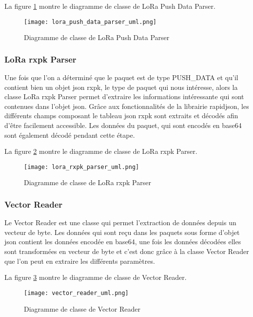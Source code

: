 La figure \ref{fig:lora_push_data_parser_uml} montre le diagramme de classe de LoRa Push Data Parser.

\begin{figure}[htb]
\centering 
\texttt{[image: lora\_push\_data\_parser\_uml.png]} 
\caption{Diagramme de classe de LoRa Push Data Parser}
\label{fig:lora_push_data_parser_uml}
 \end{figure}

\subsubsection{LoRa rxpk Parser}

Une fois que l'on a déterminé que le paquet est de type PUSH\_DATA et qu'il contient bien un objet json rxpk, le type de paquet qui nous intéresse, alors la classe LoRa rxpk Parser permet d'extraire les informations intéressante qui sont contenues dans l'objet json. Grâce aux fonctionnalités de la librairie rapidjson, les différents champs composant le tableau json rxpk sont extraits et décodés afin d'être facilement accessible. Les données du paquet, qui sont encodés en base64 sont également décodé pendant cette étape.

La figure \ref{fig:lora_rxpk_parser_uml} montre le diagramme de classe de LoRa rxpk Parser.

\begin{figure}[htb]
\centering 
\texttt{[image: lora\_rxpk\_parser\_uml.png]} 
\caption{Diagramme de classe de LoRa rxpk Parser}
\label{fig:lora_rxpk_parser_uml}
 \end{figure}

\subsubsection{Vector Reader}

Le Vector Reader est une classe qui permet l'extraction de données depuis un vecteur de byte. Les données qui sont reçu dans les paquets sous forme d'objet json contient les données encodée en base64, une fois les données décodées elles sont transformées en vecteur de byte et c'est donc grâce à la classe Vector Reader que l'on peut en extraire les différents paramètres.

La figure \ref{fig:vector_reader_uml} montre le diagramme de classe de Vector Reader.

\begin{figure}[htb]
\centering 
\texttt{[image: vector\_reader\_uml.png]} 
\caption{Diagramme de classe de Vector Reader}
\label{fig:vector_reader_uml}
 \end{figure}

